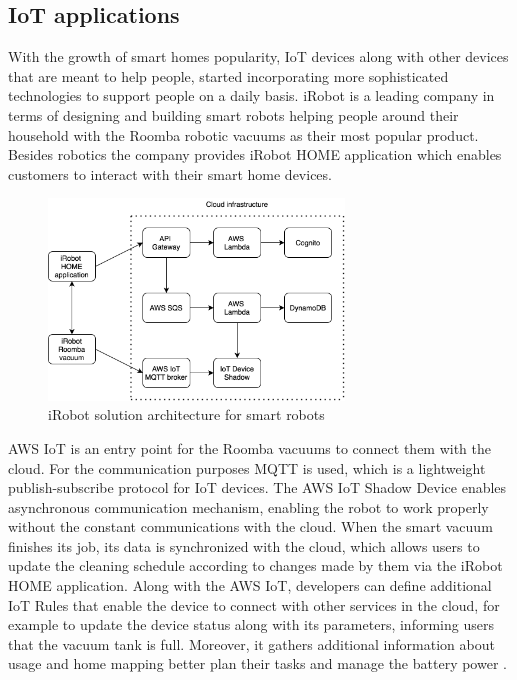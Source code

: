 \subsection{IoT applications}

With the growth of smart homes popularity, IoT devices along with other devices that are meant to help people, started incorporating more sophisticated technologies to support people on a daily basis. iRobot is a leading company in terms of designing and building smart robots helping people around their household with the Roomba robotic vacuums as their most popular product. Besides robotics the company provides iRobot HOME application which enables customers to interact with their smart home devices.

\begin{figure}[h]
    \centering
    \includegraphics[width=0.7\textwidth]{assets/02-serverless/iRobotArchitecture.png}
    \caption{iRobot solution architecture for smart robots}
    \label{fig:irobot-architecture-diagram}
\end{figure}

AWS IoT is an entry point for the Roomba vacuums to connect them with the cloud. For the communication purposes MQTT is used, which is a lightweight publish-subscribe protocol for IoT devices. The AWS IoT Shadow Device enables asynchronous communication mechanism, enabling the robot to work properly without the constant communications with the cloud. When the smart vacuum finishes its job, its data is synchronized with the cloud, which allows users to update the cleaning schedule according to changes made by them via the iRobot HOME application. Along with the AWS IoT, developers can define additional IoT Rules that enable the device to connect with other services in the cloud, for example to update the device status along with its parameters, informing users that the vacuum tank is full. Moreover, it gathers additional information about usage and home mapping better plan their tasks and manage the battery power \cite{ServerlessIoTatiRobot}.

